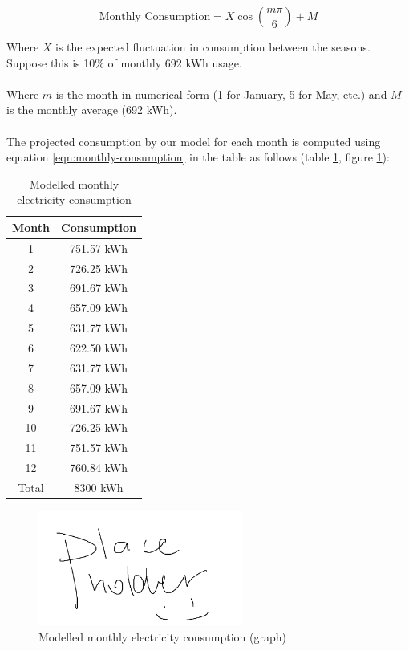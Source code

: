 \documentclass[10pt,letterpaper]{article}
\begin{document}
\begin{equation}
	\text{Monthly Consumption}=X\cos\left(\frac{m\pi}{6}\right)+M
	\label{eqn:monthly-consumption}
\end{equation}

Where $X$ is the expected fluctuation in consumption between the seasons. Suppose this is 10\% of monthly 692 kWh usage.\\
\\
Where $m$ is the month in numerical form (1 for January, 5 for May, etc.) and $M$ is the monthly average (692 kWh).\\
\\
The projected consumption by our model for each month is computed using equation \ref{eqn:monthly-consumption} in the table as follows (table \ref{table:consumption-table}, figure \ref{fig:consumption-graph}):

\begin{table}[H]
	\centering
	\begin{tabular}{ |c|c| }
		\hline
		Month & Consumption\\
		\hline
		1 & 751.57 kWh\\
		2 & 726.25 kWh\\
		3 & 691.67 kWh\\
		4 & 657.09 kWh\\
		5 & 631.77 kWh\\
		6 & 622.50 kWh\\
		7 & 631.77 kWh\\
		8 & 657.09 kWh\\
		9 & 691.67 kWh\\
		10 & 726.25 kWh\\
		11 & 751.57 kWh\\
		12 & 760.84 kWh\\
		\hline
		Total & 8300 kWh\\
		\hline
	\end{tabular}
	\caption{Modelled monthly electricity consumption}
	\label{table:consumption-table}
\end{table}

\begin{figure}[H]
	\centering
	\includegraphics[width=0.6\textwidth]{assets/placeholder}
	\caption{Modelled monthly electricity consumption (graph)}
	\label{fig:consumption-graph}
\end{figure}
\end{document}
